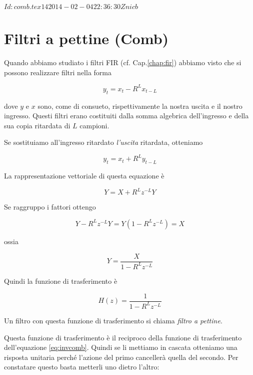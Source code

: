 %
%
\svnInfo $Id: comb.tex 14 2014-02-04 22:36:30Z nicb $

\chapter{Filtri a pettine (Comb)\label{chap:comb}}

Quando abbiamo studiato i filtri FIR (cf. Cap.\ref{chap:fir}) abbiamo
visto che si possono realizzare filtri nella forma

\begin{equation}\label{eq:invcomb}
  y_t = x_t - R^{L} x_{t-L}
\end{equation}

dove $y$ e $x$ sono, come di consueto, rispettivamente la nostra uscita e il
nostro ingresso. Questi filtri erano costituiti dalla somma algebrica
dell'ingresso e della sua copia ritardata di $L$ campioni.

Se sostituiamo all'ingresso ritardato \emph{l'uscita} ritardata, otteniamo

\begin{equation}
  y_t = x_t + R^{L} y_{t-L}
\end{equation}

La rappresentazione vettoriale di questa equazione \`e

\begin{equation}
  Y = X + R^{L} z^{-L} Y
\end{equation}

Se raggruppo i fattori ottengo

\begin{equation}
  Y - R^{L} z^{-L} Y = Y ( 1 - R^{L} z^{-L} ) = X
\end{equation}

ossia

\begin{equation}
  Y = \frac{X}{1 - R^{L} z^{-L}}
\end{equation}

Quindi la funzione di trasferimento \`e

\begin{equation}
 H ( z ) = \frac{1}{1 - R^{L} z^{-L}}
\end{equation}

Un filtro con questa funzione di trasferimento si chiama
\emph{filtro a pettine}.

Questa funzione di trasferimento \`e il reciproco della funzione di
trasferimento dell'equazione \ref{eq:invcomb}. Quindi se li mettiamo in 
cascata otteniamo una risposta unitaria perch\'e l'azione del primo
canceller\`a quella del secondo.
Per constatare questo basta metterli uno dietro l'altro:


